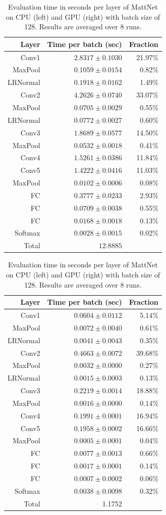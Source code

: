 \begin{table}
\tiny
\parbox{.45\linewidth}{
\centering
\begin{tabular}{rrr}
\hline
Layer & Time per batch (sec) & Fraction \\
\hline
Conv1 & $2.8317 \pm 0.1030 $ & 21.97\% \\
MaxPool & $0.1059 \pm 0.0154$ & 0.82\% \\
LRNormal & $0.1918 \pm 0.0162$ & 1.49\% \\
Conv2 & $4.2626 \pm 0.0740 $ & 33.07\% \\
MaxPool & $0.0705  \pm 0.0029$ & 0.55\% \\
LRNormal & $0.0772\pm 0.0027$ & 0.60\% \\
Conv3 & $1.8689\pm 0.0577$ & 14.50\% \\
MaxPool & $0.0532\pm 0.0018 $ & 0.41\% \\
Conv4 & $1.5261\pm 0.0386$ & 11.84\% \\
Conv5 & $1.4222\pm 0.0416$& 11.03\% \\
MaxPool & $0.0102\pm 0.0006 $ & 0.08\% \\
FC & $0.3777\pm 0.0233$ & 2.93\% \\
FC & $0.0709  \pm 0.0038$ & 0.55\% \\
FC & $0.0168 \pm 0.0018$ & 0.13\% \\
Softmax & $0.0028 \pm 0.0015$ & 0.02\%\\
\hline 
Total & $12.8885$ & \\
\hline
\end{tabular}
}
\parbox{.45\linewidth}{
\centering
\begin{tabular}{rrr}
\hline
Layer & Time per batch (sec) & Fraction \\
\hline
Conv1 & $0.0604 \pm 0.0112$ & 5.14\% \\
MaxPool & $0.0072 \pm 0.0040$ & 0.61\% \\
LRNormal & $0.0041 \pm 0.0043$ &  0.35\% \\
Conv2 & $0.4663 \pm 0.0072$ & 39.68\% \\
MaxPool & $0.0032 \pm 0.0000$ &  0.27\% \\
LRNormal & $0.0015 \pm 0.0003$ & 0.13\% \\
Conv3 & $0.2219 \pm 0.0014$ & 18.88\% \\
MaxPool & $0.0016 \pm 0.0000$ & 0.14\% \\
Conv4 & $0.1991 \pm 0.0001$ & 16.94\% \\
Conv5 & $0.1958 \pm 0.0002$ &  16.66\% \\
MaxPool & $0.0005  \pm 0.0001$ & 0.04\% \\
FC & $0.0077 \pm 0.0013$ & 0.66\% \\
FC & $0.0017 \pm 0.0001$ & 0.14\% \\
FC & $0.0007 \pm 0.0002$  & 0.06\% \\
Softmax & $0.0038 \pm 0.0098$ & 0.32\%\\
\hline 
Total & 1.1752 & \\
\hline
\end{tabular}
}
\caption{Evaluation time in seconds per layer of MattNet on CPU (left)
  and GPU (right) with batch size of 128. Results are averaged over 8
  runs.} 
\label{evaluation_time}
\end{table}
